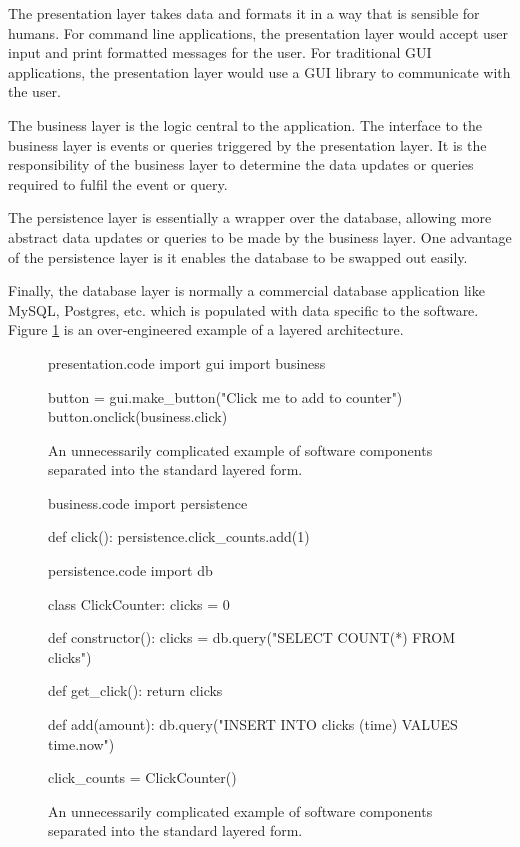 The presentation layer takes data and formats it in a way that is sensible for humans.
For command line applications, the presentation layer would accept user input and print formatted messages for the user.
For traditional GUI applications, the presentation layer would use a GUI library to communicate with the user.

The business layer is the logic central to the application.
The interface to the business layer is events or queries triggered by the presentation layer.
It is the responsibility of the business layer to determine the data updates or queries required to fulfil the event or query.

The persistence layer is essentially a wrapper over the database,
allowing more abstract data updates or queries to be made by the business layer.
One advantage of the persistence layer is it enables the database to be swapped out easily.

Finally, the database layer is normally a commercial database application like MySQL, Postgres, etc.
which is populated with data specific to the software.
Figure \ref{fig:standard-form-example} is an over-engineered example of a layered architecture.

\begin{figure}[H]
\begin{code}[style=python]{presentation.code}
import gui
import business

button = gui.make_button("Click me to add to counter")
button.onclick(business.click)
\end{code}
\caption{An unnecessarily complicated example of software components separated into the standard layered form.}
\label{fig:standard-form-example}
\end{figure}

\begin{figure}[H]
\ContinuedFloat
\begin{code}[style=python]{business.code}
import persistence

def click():
    persistence.click_counts.add(1)
\end{code}

\begin{code}[style=python]{persistence.code}
import db

class ClickCounter:
    clicks = 0

    def constructor():
        clicks = db.query("SELECT COUNT(*) FROM clicks")

    def get_click():
        return clicks

    def add(amount):
        db.query("INSERT INTO clicks (time) VALUES {{time.now}}")

click_counts = ClickCounter()
\end{code}
\caption{An unnecessarily complicated example of software components separated into the standard layered form.}
\end{figure}

